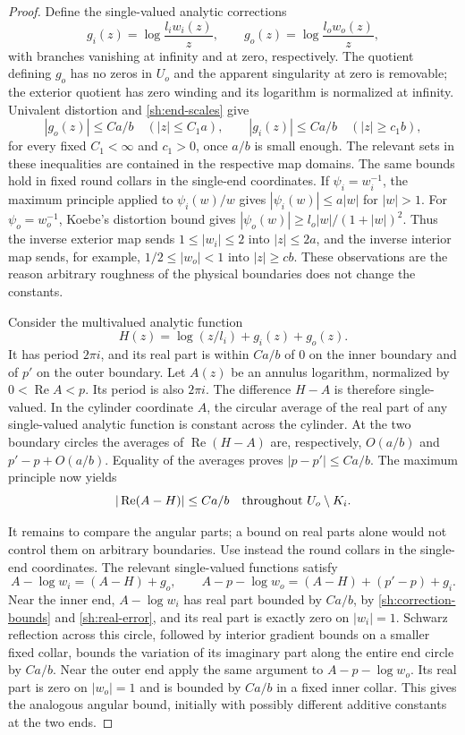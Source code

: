 \begin{proof}
Define the single-valued analytic corrections
\[
 g_i(z)=\log\frac{l_iw_i(z)}z,
 \qquad g_o(z)=\log\frac{l_ow_o(z)}z,
\]
with branches vanishing at infinity and at zero, respectively.
The quotient defining $g_o$ has no zeros in $U_o$ and the apparent
singularity at zero is removable; the exterior quotient has zero
winding and its logarithm is normalized at infinity.
Univalent distortion and \eqref{sh:end-scales} give
\begin{equation}\label{sh:correction-bounds}
 |g_o(z)|\le Ca/b\quad (|z|\le C_1a),\qquad
 |g_i(z)|\le Ca/b\quad (|z|\ge c_1b),
\end{equation}
for every fixed $C_1<\infty$ and $c_1>0$, once $a/b$ is small
enough.  The relevant sets in these inequalities are contained in
the respective map domains.  The same bounds hold in fixed round
collars in the single-end coordinates.  If $\psi_i=w_i^{-1}$,
the maximum principle applied to $\psi_i(w)/w$ gives
$|\psi_i(w)|\le a|w|$ for $|w|>1$.
For $\psi_o=w_o^{-1}$, Koebe's distortion bound gives
$|\psi_o(w)|\ge l_o|w|/(1+|w|)^2$.
Thus the inverse exterior map sends $1\le|w_i|\le2$ into
$|z|\le2a$, and the inverse interior map sends, for example,
$1/2\le|w_o|<1$ into $|z|\ge cb$.
These observations are the reason arbitrary roughness of the physical
boundaries does not change the constants.

Consider the multivalued analytic function
\[
 H(z)=\log(z/l_i)+g_i(z)+g_o(z).
\]
It has period $2\pi i$, and its real part is within $Ca/b$ of $0$
on the inner boundary and of $p'$ on the outer boundary.  Let
$A(z)$ be an annulus logarithm, normalized by
$0<\operatorname{Re}A<p$.  Its period is also $2\pi i$.
The difference $H-A$ is therefore single-valued.  In the cylinder
coordinate $A$, the circular average of the real part of any
single-valued analytic function is constant across the cylinder.
At the two boundary circles the averages of
$\operatorname{Re}(H-A)$ are, respectively, $O(a/b)$ and
$p'-p+O(a/b)$.  Equality of the averages proves
$|p-p'|\le Ca/b$.  The maximum principle now yields
\begin{equation}\label{sh:real-error}
 |\operatorname{Re}(A-H)|\le Ca/b
 \quad\hbox{throughout }U_o\setminus K_i.
\end{equation}

It remains to compare the angular parts; a bound on real parts
alone would not control them on arbitrary boundaries.  Use instead
the round collars in the single-end coordinates.  The relevant
single-valued functions satisfy
\[
 A-\log w_i=(A-H)+g_o,\qquad
 A-p-\log w_o=(A-H)+(p'-p)+g_i.
\]
Near the inner
end, $A-\log w_i$ has real part bounded by $Ca/b$, by
\eqref{sh:correction-bounds} and \eqref{sh:real-error}, and its
real part is exactly zero on $|w_i|=1$.  Schwarz reflection across
this circle, followed by interior gradient bounds on a smaller fixed
collar, bounds the variation of its imaginary part along the entire
end circle by $Ca/b$.  Near the outer end apply the same argument
to $A-p-\log w_o$.  Its real part is zero on $|w_o|=1$ and is
bounded by $Ca/b$ in a fixed inner collar.  This gives the analogous
angular bound, initially with possibly different additive constants
at the two ends.


\end{proof}
